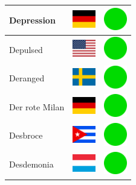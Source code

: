 \documentclass[12pt, a4paper, twoside]{report}
\begin{document}
\begin{center}
\begin{longtable}{|p{5cm}|p{2cm}|p{2cm}|}
 Depression                                                 & \includegraphics[width=1cm]{4x3/de} &   \includegraphics[width=1cm]{likes/y} \\ \hline
 Depulsed                                                   & \includegraphics[width=1cm]{4x3/us} &   \includegraphics[width=1cm]{likes/y} \\ \hline
 Deranged                                                   & \includegraphics[width=1cm]{4x3/se} &   \includegraphics[width=1cm]{likes/y} \\ \hline
 Der rote Milan                                             & \includegraphics[width=1cm]{4x3/de} &   \includegraphics[width=1cm]{likes/y} \\ \hline
 Desbroce                                                   & \includegraphics[width=1cm]{4x3/cu} &   \includegraphics[width=1cm]{likes/y} \\ \hline
 Desdemonia                                                 & \includegraphics[width=1cm]{4x3/lu} &   \includegraphics[width=1cm]{likes/y} \\ \hline

\end{longtable}
\end{center}
\end{document}
